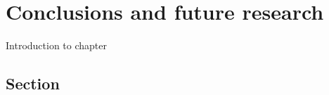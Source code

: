 \chapter{Conclusions and future research}
\label{chap:conclusions}
Introduction to chapter

\section{Section}
\label{sec:fifth-section}

\newpage